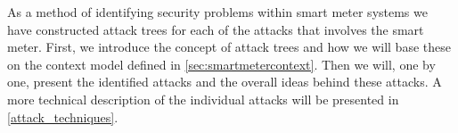 
As a method of identifying security problems within smart meter systems we have constructed attack trees for each of the attacks that involves the smart meter.
First, we introduce the concept of attack trees and how we will base these on the context model defined in \cref{sec:smartmetercontext}.
Then we will, one by one, present the identified attacks and the overall ideas behind these attacks.
A more technical description of the individual attacks will be presented in \cref{attack_techniques}.
